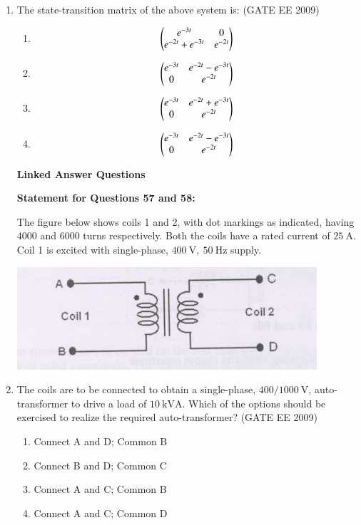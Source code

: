 \documentclass[journal,12pt,onecolumn]{IEEEtran}
\theoremstyle{remark}
\begin{document}
\begin{flushleft}
\begin{enumerate}
\item  The state-transition matrix of the above system is:
\hfill(GATE EE 2009)
\begin{enumerate}
\item \[ \begin{pmatrix}
e^{-3t} & 0 \\
e^{-2t} + e^{-3t} & e^{-2t} \end{pmatrix} 
\]
\item \[ \begin{pmatrix}
e^{-3t} & e^{-2t} - e^{-3t} \\
0 & e^{-2t} \end{pmatrix}
\]
\item \[\begin{pmatrix}
e^{-3t} & e^{-2t} + e^{-3t} \\
0 & e^{-2t} \end{pmatrix} 
\]
\item \[ \begin{pmatrix}
e^{-3t} & e^{-2t} - e^{-3t} \\
0 & e^{-2t} \end{pmatrix}
\]
\end{enumerate}



\textbf{Linked Answer Questions}

\textbf{Statement for Questions 57 and 58:}

The figure below shows coils 1 and 2, with dot markings as indicated, having \( 4000 \) and \( 6000 \) turns respectively.  
Both the coils have a rated current of \( 25 \ \mathrm{A} \).  
Coil 1 is excited with single-phase, \( 400 \ \mathrm{V},\ 50 \ \mathrm{Hz} \) supply.

\begin{center}
\includegraphics[width=0.6\columnwidth]{figs/Screenshot 2025-08-09 110459.png}
\label{fig:placeholder}
\end{center}
 
\item The coils are to be connected to obtain a single-phase, \(400/1000 \ \mathrm{V}\), auto-transformer to drive a load of \(10 \ \mathrm{kVA}\).  
Which of the options should be exercised to realize the required auto-transformer?
\hfill(GATE EE 2009)
\begin{enumerate}
\item Connect A and D; Common B 
\item Connect B and D; Common C 
\item  Connect A and C; Common B 
\item  Connect A and C; Common D
\end{enumerate}



\end{enumerate}
\end{flushleft}
\end{document}
